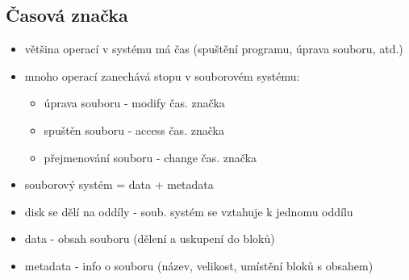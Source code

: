 \subsection{Časová značka}
\begin{itemize}
    \item většina operací v systému má čas (spuštění programu, úprava souboru, atd.)
    \item mnoho operací zanechává stopu v souborovém systému:
    \begin{itemize}
        \item úprava souboru - modify čas. značka
        \item spuštěn souboru - access čas. značka
        \item přejmenování souboru - change čas. značka
    \end{itemize}
    \item souborový systém = data + metadata
    \item disk se dělí na oddíly - soub. systém se vztahuje k jednomu oddílu
    \item data - obsah souboru (dělení a uskupení do bloků)
    \item metadata - info o souboru (název, velikost, umístění bloků s obsahem)
\end{itemize}

